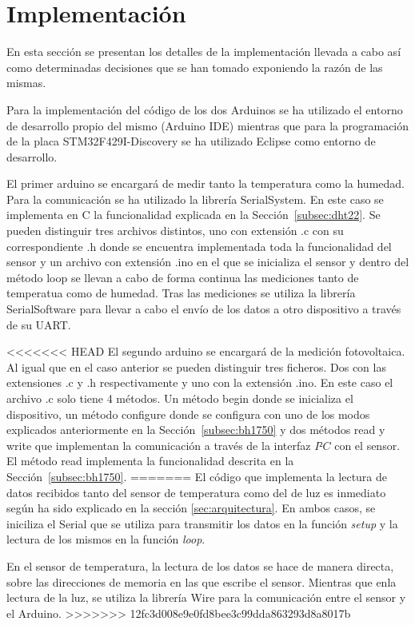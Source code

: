 \section{Implementaci\'on}\label{sec:imp}
En esta secci\'on se presentan los detalles de la implementaci\'on
llevada a cabo as\'i como determinadas decisiones que se han tomado
exponiendo la raz\'on de las mismas.

Para la implementaci\'on del c\'odigo de los dos Arduinos se ha
utilizado el entorno de desarrollo propio del mismo (Arduino IDE)
mientras que para la programaci\'on de la placa STM32F429I-Discovery
se ha utilizado Eclipse como entorno de desarrollo.

El primer arduino se encargar\'a de medir tanto la temperatura como la
humedad. Para la comunicaci\'on se ha utilizado la librer\'ia
SerialSystem. En este caso se implementa en C la funcionalidad
explicada en la Secci\'on~\ref{subsec:dht22}. Se pueden distinguir
tres archivos distintos, uno con extensi\'on .c con su correspondiente .h donde se
encuentra implementada toda la funcionalidad del sensor y un archivo
con extensi\'on .ino en el que se inicializa el sensor y dentro del
m\'etodo loop se llevan a cabo de forma continua las mediciones tanto
de temperatua como de humedad. Tras las mediciones se utiliza la
librer\'ia SerialSoftware para llevar a cabo el env\'io de los datos a
otro dispositivo a trav\'es de su UART.

<<<<<<< HEAD
El segundo arduino se encargar\'a de la medici\'on fotovoltaica. Al
igual que en el caso anterior se pueden distinguir tres ficheros. Dos
con las extensiones .c y .h respectivamente y uno con la extensi\'on
.ino. En este caso el archivo .c solo tiene 4 m\'etodos. Un m\'etodo
begin donde se inicializa el dispositivo, un m\'etodo configure donde
se configura con uno de los modos explicados anteriormente en la
Secci\'on~\ref{subsec:bh1750} y dos m\'etodos read y write que
implementan la comunicaci\'on a trav\'es de la interfaz $I²C$ con el
sensor. El m\'etodo read implementa la funcionalidad descrita en la
Secci\'on~\ref{subsec:bh1750}. 
=======
El c\'odigo que implementa la lectura de datos recibidos tanto del
sensor de temperatura como del de luz es inmediato seg\'un ha sido explicado en
la secci\'on \ref{sec:arquitectura}. En ambos casos, se iniciliza el
Serial que se utiliza para transmitir los datos en la funci\'on \emph{setup}
y la lectura de los mismos en la funci\'on \emph{loop}. 

En el sensor de temperatura, la lectura de los datos se hace de manera
directa, sobre las direcciones de memoria en las que escribe el sensor.
Mientras que enla lectura de la luz, se utiliza la librer\'ia Wire para la
comunicaci\'on entre el sensor y el Arduino. 
>>>>>>> 12fc3d008e9e0fd8bee3c99dda863293d8a8017b

